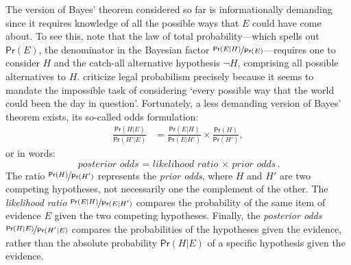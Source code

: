 \documentclass{article}
\newcommand{\pr}{\mathsf{Pr}}
\begin{document}
The version of Bayes' theorem considered so far is informationally demanding since it requires knowledge of all the possible ways that $E$ could have come about. To see this, note that the law of total probability---which spells out $\pr(E)$, the denominator in the Bayesian factor $\nicefrac{\pr(E \vert H)}{\pr(E)}$---requires one to consider $H$ and the catch-all alternative hypothesis $\neg H$, comprising all possible alternatives to $H$.  \cite{AllenPardo2019relative}
 criticize legal probabilism precisely because it seems to  mandate the impossible task of considering `every possible way that the world could been the day in question'. Fortunately, a less demanding version of Bayes' theorem exists,
 its so-called odds 
formulation: 
%
\begin{align*}\frac{\pr(H \vert E)} {\pr(H' \vert E)}& = \frac{\pr(E \vert H)}{\pr(E \vert H')} \times \frac{\pr(H)} {\pr(H')}, \end{align*}
%
or in words:
\[\textit{posterior odds = likelihood ratio $\times$ prior odds}. \]
%
The ratio $\nicefrac{\pr(H)}{\pr(H')}$ represents the \textit{prior odds}, where $H$ and $H'$ are two competing hypotheses, not necessarily one the complement of the other.  
%
The \textit{likelihood ratio} $\nicefrac{\pr(E \vert H)}{\pr(E \vert H')}$ 
compares the probability of the same item of evidence $E$ given the two 
competing hypotheses. 
Finally, the \textit{posterior odds} $\nicefrac{\pr(H \vert E)}{\pr(H' \vert E)}$ compares the probabilities of the  hypotheses given the evidence, rather than the absolute probability $\pr(H \vert E)$ of a specific hypothesis given the evidence.
%
\end{document}
